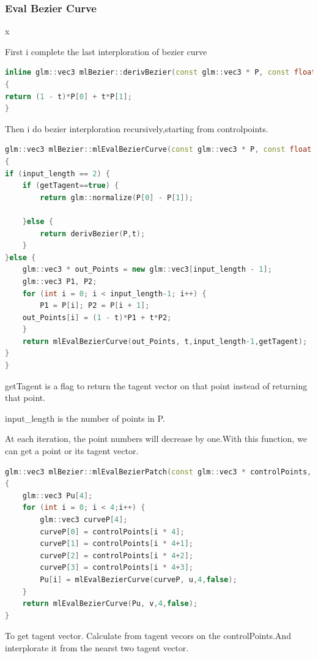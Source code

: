 \documentclass[acmtog]{acmart}
\begin{document}
\subsubsection{Eval Bezier Curve } x
\par First i complete the last interploration of bezier curve 
\begin{lstlisting}[frame=single,breaklines=true,language=c++,basicstyle=\footnotesize\ttfamily]
inline glm::vec3 mlBezier::derivBezier(const glm::vec3 * P, const float & t)
{
return (1 - t)*P[0] + t*P[1];
}
\end{lstlisting}
\par Then i do bezier interploration recursively,starting from controlpoints.
\begin{lstlisting}[frame=single,breaklines=true,language=c++,basicstyle=\footnotesize\ttfamily]
glm::vec3 mlBezier::mlEvalBezierCurve(const glm::vec3 * P, const float & t ,int input_length,bool getTagent)
{
if (input_length == 2) {
	if (getTagent==true) {
		return glm::normalize(P[0] - P[1]);

	}else {
		return derivBezier(P,t);
	}
}else {
	glm::vec3 * out_Points = new glm::vec3[input_length - 1];
	glm::vec3 P1, P2;
	for (int i = 0; i < input_length-1; i++) {
		P1 = P[i]; P2 = P[i + 1];
	out_Points[i] = (1 - t)*P1 + t*P2;
	}
	return mlEvalBezierCurve(out_Points, t,input_length-1,getTagent);
}
}
\end{lstlisting}
\par getTagent is a flag to return the tagent vector on that point instead of returning that point.\par input\_length is the number of points in P.\par At each iteration, the point numbers will decrease by one.With this function, we can get a point or its tagent vector.
\begin{lstlisting}[frame=single,breaklines=true,language=c++,basicstyle=\footnotesize\ttfamily]
glm::vec3 mlBezier::mlEvalBezierPatch(const glm::vec3 * controlPoints, const float & u, const float & v)
{
	glm::vec3 Pu[4];
	for (int i = 0; i < 4;i++) {
		glm::vec3 curveP[4];
		curveP[0] = controlPoints[i * 4];
		curveP[1] = controlPoints[i * 4+1];
		curveP[2] = controlPoints[i * 4+2];
		curveP[3] = controlPoints[i * 4+3];
		Pu[i] = mlEvalBezierCurve(curveP, u,4,false);
	}
	return mlEvalBezierCurve(Pu, v,4,false);
}
\end{lstlisting}
\par To get tagent vector. Calculate from tagent vecors on the controlPoints.And interplorate it from the nearst two tagent vector.
\end{document}
